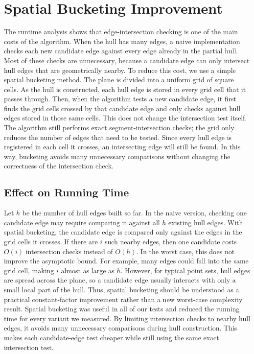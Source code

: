 \documentclass[10pt,twocolumn]{article}
\begin{document}
\section{Spatial Bucketing Improvement}
The runtime analysis shows that edge-intersection checking is one of the main
costs of the algorithm. When the hull has many edges, a naive implementation checks
each new candidate edge against every edge already in the partial hull. Most of these
checks are unnecessary, because a candidate edge can only intersect hull edges that are
geometrically nearby.
To reduce this cost, we use a simple spatial bucketing method. The plane is divided
into a uniform grid of square cells. As the hull is constructed, each hull edge is
stored in every grid cell that it passes through. Then, when the algorithm tests a new
candidate edge, it first finds the grid cells crossed by that candidate edge and only
checks against hull edges stored in those same cells.
This does not change the intersection test itself. The algorithm still performs exact
segment-intersection checks; the grid only reduces the number of edges that need to be
tested. Since every hull edge is registered in each cell it crosses, an intersecting
edge will still be found. In this way, bucketing avoids many unnecessary comparisons
without changing the correctness of the intersection check.
\subsection{Effect on Running Time}
Let $h$ be the number of hull edges built so far. In the naive
version, checking one candidate edge may require comparing
it against all $h$ existing hull edges. With spatial bucketing,
the candidate edge is compared only against the edges in the
grid cells it crosses. If there are $i$ such nearby edges, then one
candidate costs $O(i)$ intersection checks instead of $O(h)$.
In the worst case, this does not improve the asymptotic
bound. For example, many edges could fall into the same
grid cell, making $i$ almost as large as $h$. However, for
typical point sets, hull edges are spread across the plane, so a
candidate edge usually interacts with only a small local part
of the hull. Thus, spatial bucketing should be understood
as a practical constant-factor improvement rather than a new
worst-case complexity result.
Spatial bucketing was useful in all of our tests and reduced the running time for every variant we measured. By limiting intersection checks to nearby hull edges, it avoids many unnecessary comparisons during hull construction. This makes each candidate-edge test cheaper while still using the same exact intersection test.
\end{document}
